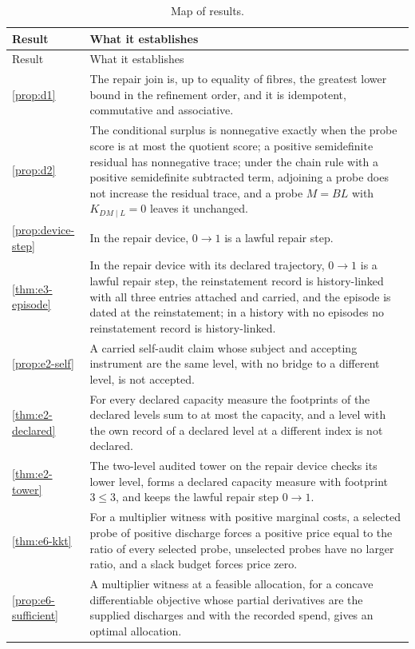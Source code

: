 \begingroup\small
\begin{longtable}{@{}>{\raggedright\arraybackslash}p{3.0cm}>{\raggedright\arraybackslash}p{12.4cm}@{}}
\caption{Map of results.}\label{tab:map}\\
\toprule
Result & What it establishes \\
\midrule
\endfirsthead
\toprule
Result & What it establishes \\
\midrule
\endhead
\bottomrule
\endfoot
\cref{prop:d1} & The repair join is, up to equality of fibres, the greatest lower bound in the refinement order, and it is idempotent, commutative and associative. \\
\cref{prop:d2} & The conditional surplus is nonnegative exactly when the probe score is at most the quotient score; a positive semidefinite residual has nonnegative trace; under the chain rule with a positive semidefinite subtracted term, adjoining a probe does not increase the residual trace, and a probe $M=BL$ with $K_{DM\mid L}=0$ leaves it unchanged. \\
\cref{prop:device-step} & In the repair device, $0\to1$ is a lawful repair step. \\
\cref{thm:e3-episode} & In the repair device with its declared trajectory, $0\to1$ is a lawful repair step, the reinstatement record is history-linked with all three entries attached and carried, and the episode is dated at the reinstatement; in a history with no episodes no reinstatement record is history-linked. \\
\cref{prop:e2-self} & A carried self-audit claim whose subject and accepting instrument are the same level, with no bridge to a different level, is not accepted. \\
\cref{thm:e2-declared} & For every declared capacity measure the footprints of the declared levels sum to at most the capacity, and a level with the own record of a declared level at a different index is not declared. \\
\cref{thm:e2-tower} & The two-level audited tower on the repair device checks its lower level, forms a declared capacity measure with footprint $3\le3$, and keeps the lawful repair step $0\to1$. \\
\cref{thm:e6-kkt} & For a multiplier witness with positive marginal costs, a selected probe of positive discharge forces a positive price equal to the ratio of every selected probe, unselected probes have no larger ratio, and a slack budget forces price zero. \\
\cref{prop:e6-sufficient} & A multiplier witness at a feasible allocation, for a concave differentiable objective whose partial derivatives are the supplied discharges and with the recorded spend, gives an optimal allocation. \\

\end{longtable}
